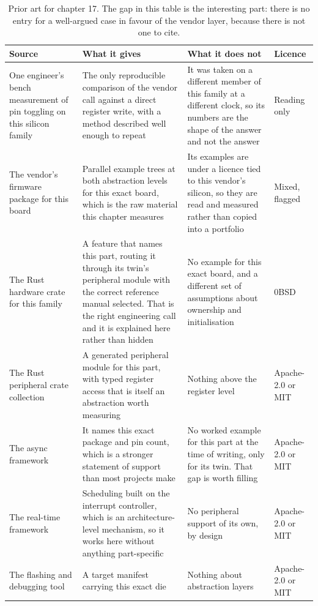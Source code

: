 \begin{table}[H]\centering\small
\begin{tabular}{p{34mm}p{46mm}p{38mm}p{20mm}}
\toprule
Source & What it gives & What it does not & Licence \\
\midrule
One engineer's bench measurement of pin toggling on this silicon family & The only reproducible comparison of the vendor call against a direct register write, with a method described well enough to repeat & It was taken on a different member of this family at a different clock, so its numbers are the shape of the answer and not the answer & Reading only \\
The vendor's firmware package for this board & Parallel example trees at both abstraction levels for this exact board, which is the raw material this chapter measures & Its examples are under a licence tied to this vendor's silicon, so they are read and measured rather than copied into a portfolio & Mixed, flagged \\
The Rust hardware crate for this family & A feature that names this part, routing it through its twin's peripheral module with the correct reference manual selected. That is the right engineering call and it is explained here rather than hidden & No example for this exact board, and a different set of assumptions about ownership and initialisation & 0BSD \\
The Rust peripheral crate collection & A generated peripheral module for this part, with typed register access that is itself an abstraction worth measuring & Nothing above the register level & Apache-2.0 or MIT \\
The async framework & It names this exact package and pin count, which is a stronger statement of support than most projects make & No worked example for this part at the time of writing, only for its twin. That gap is worth filling & Apache-2.0 or MIT \\
The real-time framework & Scheduling built on the interrupt controller, which is an architecture-level mechanism, so it works here without anything part-specific & No peripheral support of its own, by design & Apache-2.0 or MIT \\
The flashing and debugging tool & A target manifest carrying this exact die & Nothing about abstraction layers & Apache-2.0 or MIT \\
\bottomrule
\end{tabular}
\caption{Prior art for chapter 17. The gap in this table is the interesting part: there is no entry for a well-argued case in favour of the vendor layer, because there is not one to cite.}
\end{table}

